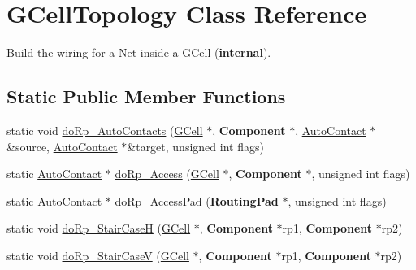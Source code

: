 \hypertarget{classanonymous__namespace_02LoadGrByNet_8cpp_03_1_1GCellTopology}{\section{G\-Cell\-Topology Class Reference}
\label{classanonymous__namespace_02LoadGrByNet_8cpp_03_1_1GCellTopology}
}


Build the wiring for a Net inside a G\-Cell ({\bfseries internal}).  


\subsection*{Static Public Member Functions}
\begin{DoxyCompactItemize}
\item 
static void \hyperlink{group__LoadGlobalRouting_gae9cae408ea16a3f7c77c3d75f0242f19}{do\-Rp\-\_\-\-Auto\-Contacts} (\hyperlink{classKatabatic_1_1GCell}{G\-Cell} $\ast$, {\bf Component} $\ast$, \hyperlink{classKatabatic_1_1AutoContact}{Auto\-Contact} $\ast$\&source, \hyperlink{classKatabatic_1_1AutoContact}{Auto\-Contact} $\ast$\&target, unsigned int flags)
\item 
static \hyperlink{classKatabatic_1_1AutoContact}{Auto\-Contact} $\ast$ \hyperlink{group__LoadGlobalRouting_gada6d3c694b8d741b6504b7c3da166357}{do\-Rp\-\_\-\-Access} (\hyperlink{classKatabatic_1_1GCell}{G\-Cell} $\ast$, {\bf Component} $\ast$, unsigned int flags)
\item 
static \hyperlink{classKatabatic_1_1AutoContact}{Auto\-Contact} $\ast$ \hyperlink{group__LoadGlobalRouting_ga60edeea78b56db072fc26a58a7afbcd4}{do\-Rp\-\_\-\-Access\-Pad} ({\bf Routing\-Pad} $\ast$, unsigned int flags)
\item 
static void \hyperlink{group__LoadGlobalRouting_ga3291d84592215974fe4052c00304bdb1}{do\-Rp\-\_\-\-Stair\-Case\-H} (\hyperlink{classKatabatic_1_1GCell}{G\-Cell} $\ast$, {\bf Component} $\ast$rp1, {\bf Component} $\ast$rp2)
\item 
static void \hyperlink{group__LoadGlobalRouting_ga6361fb0e90f35cd59063a1ee971ef2a9}{do\-Rp\-\_\-\-Stair\-Case\-V} (\hyperlink{classKatabatic_1_1GCell}{G\-Cell} $\ast$, {\bf Component} $\ast$rp1, {\bf Component} $\ast$rp2)
\end{DoxyCompactItemize}
